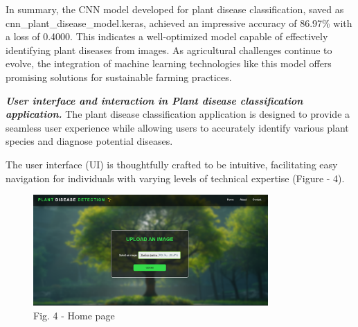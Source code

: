 \begin{multicols}{2}
In summary, the CNN model developed for plant disease classification,
saved as cnn\_plant\_disease\_model.keras, achieved an impressive
accuracy of 86.97\% with a loss of 0.4000. This indicates a
well-optimized model capable of effectively identifying plant diseases
from images. As agricultural challenges continue to evolve, the
integration of machine learning technologies like this model offers
promising solutions for sustainable farming practices.

\emph{{\bfseries User interface and interaction in Plant disease
classification application.}} The plant disease classification
application is designed to provide a seamless user experience while
allowing users to accurately identify various plant species and diagnose
potential diseases.

The user interface (UI) is thoughtfully crafted to be intuitive,
facilitating easy navigation for individuals with varying levels of
technical expertise (Figure - 4).
\end{multicols}

\begin{figure}[H]
	\centering
	\includegraphics[width=0.8\textwidth]{media/ict/image33}
	\caption*{Fig. 4 - Home page}
\end{figure}

